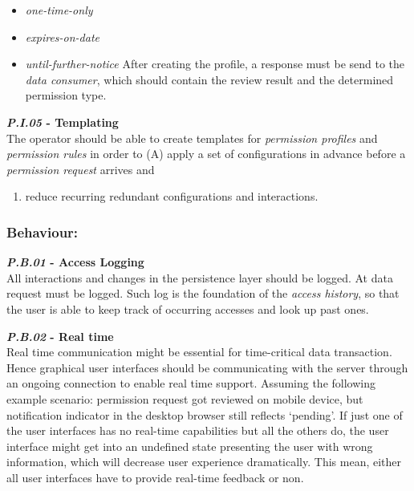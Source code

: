 \documentclass[12pt,english,a4paper,titlepage,cleardoublepage=empty,dottedtoc]{report}
\providecommand{\tightlist}{%
  \setlength{\itemsep}{0pt}\setlength{\parskip}{0pt}}
\begin{document}
\begin{itemize}
\tightlist
\item
  \emph{one-time-only}
\item
  \emph{expires-on-date}
\item
  \emph{until-further-notice} After creating the profile, a response
  must be send to the \emph{data consumer}, which should contain the
  review result and the determined permission type.
\end{itemize}

\textbf{\emph{\protect\hypertarget{pi05}{}{P.I.05}} - Templating}\\
The operator should be able to create templates for \emph{permission
profiles} and \emph{permission rules} in order to (A) apply a set of
configurations in advance before a \emph{permission request} arrives and

\begin{enumerate}
\def\labelenumi{(\Alph{enumi})}
\setcounter{enumi}{1}
\tightlist
\item
  reduce recurring redundant configurations and interactions.
\end{enumerate}

\subsubsection{Behaviour:}\label{behaviour}

\textbf{\emph{\protect\hypertarget{pb01}{}{P.B.01}} - Access Logging}\\
All interactions and changes in the persistence layer should be logged.
At data request must be logged. Such log is the foundation of the
\emph{access history}, so that the user is able to keep track of
occurring accesses and look up past ones.

\textbf{\emph{\protect\hypertarget{pb02}{}{P.B.02}} - Real time}\\
Real time communication might be essential for time-critical data
transaction. Hence graphical user interfaces should be communicating
with the server through an ongoing connection to enable real time
support. Assuming the following example scenario: permission request got
reviewed on mobile device, but notification indicator in the desktop
browser still reflects `pending'. If just one of the user interfaces has
no real-time capabilities but all the others do, the user interface
might get into an undefined state presenting the user with wrong
information, which will decrease user experience dramatically. This
mean, either all user interfaces have to provide real-time feedback or
non.
\end{document}
